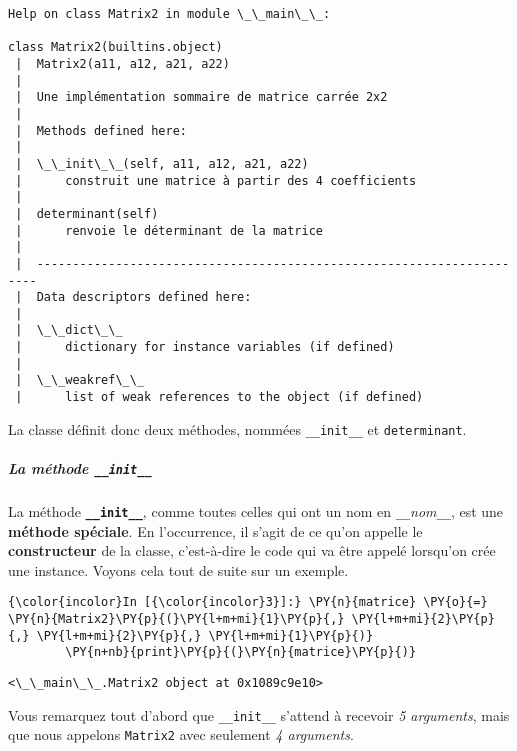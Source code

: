     \begin{Verbatim}[commandchars=\\\{\},frame=single,framerule=0.3mm,rulecolor=\color{cellframecolor}]
Help on class Matrix2 in module \_\_main\_\_:

class Matrix2(builtins.object)
 |  Matrix2(a11, a12, a21, a22)
 |  
 |  Une implémentation sommaire de matrice carrée 2x2
 |  
 |  Methods defined here:
 |  
 |  \_\_init\_\_(self, a11, a12, a21, a22)
 |      construit une matrice à partir des 4 coefficients
 |  
 |  determinant(self)
 |      renvoie le déterminant de la matrice
 |  
 |  ----------------------------------------------------------------------
 |  Data descriptors defined here:
 |  
 |  \_\_dict\_\_
 |      dictionary for instance variables (if defined)
 |  
 |  \_\_weakref\_\_
 |      list of weak references to the object (if defined)
\end{Verbatim}

    La classe définit donc deux méthodes, nommées \texttt{\_\_init\_\_} et
\texttt{determinant}.

    \hypertarget{la-muxe9thode-__init__}{%
\subparagraph{\texorpdfstring{La méthode
\texttt{\_\_init\_\_}}{La méthode \_\_init\_\_}}\label{la-muxe9thode-__init__}}

    La méthode \textbf{\texttt{\_\_init\_\_}}, comme toutes celles qui ont
un nom en \texttt{\_\_}\emph{nom}\texttt{\_\_}, est une \textbf{méthode
spéciale}. En l'occurrence, il s'agit de ce qu'on appelle le
\textbf{constructeur} de la classe, c'est-à-dire le code qui va être
appelé lorsqu'on crée une instance. Voyons cela tout de suite sur un
exemple.

    \begin{Verbatim}[commandchars=\\\{\},frame=single,framerule=0.3mm,rulecolor=\color{cellframecolor}]
{\color{incolor}In [{\color{incolor}3}]:} \PY{n}{matrice} \PY{o}{=} \PY{n}{Matrix2}\PY{p}{(}\PY{l+m+mi}{1}\PY{p}{,} \PY{l+m+mi}{2}\PY{p}{,} \PY{l+m+mi}{2}\PY{p}{,} \PY{l+m+mi}{1}\PY{p}{)}
        \PY{n+nb}{print}\PY{p}{(}\PY{n}{matrice}\PY{p}{)}
\end{Verbatim}


    \begin{Verbatim}[commandchars=\\\{\},frame=single,framerule=0.3mm,rulecolor=\color{cellframecolor}]
<\_\_main\_\_.Matrix2 object at 0x1089c9e10>
\end{Verbatim}

    Vous remarquez tout d'abord que \texttt{\_\_init\_\_} s'attend à
recevoir \emph{5 arguments}, mais que nous appelons \texttt{Matrix2}
avec seulement \emph{4 arguments}.

